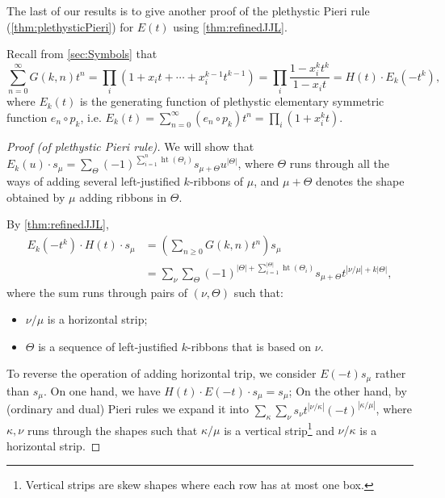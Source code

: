 \documentclass[pdflatex,sn-mathphys-num]{sn-jnl}%
\theoremstyle{thmstyleone}%
\theoremstyle{thmstyletwo}%
\theoremstyle{thmstylethree}%
\numberwithin{equation}{section}
\DeclareMathOperator{\htt}{ht}
\begin{document}
        The last of our results is to give another proof of the plethystic Pieri rule (\cref{thm:plethysticPieri}) for $E(t)$ using \cref{thm:refinedJJL}.

        Recall from \cref{sec:Symbols} that 
        \[\sum_{n=0}^\infty G(k,n) t^n = \prod_{i} (1+x_it+\cdots+x_i^{k-1}t^{k-1}) = \prod_i \frac{1-x_i^kt^k}{1-x_it}= H(t)\cdot E_k(-t^k),\]
        where $E_k(t)$ is the generating function of plethystic elementary symmetric function $e_n\circ p_k$, i.e. $E_k(t)=\sum_{n=0}^\infty (e_n\circ p_k)t^n=\prod_{i}(1+x_i^kt)$.

        
        \begin{proof}[Proof (of plethystic Pieri rule)]
            We will show that $E_k(u)\cdot s_\mu = \sum_{\Theta} (-1)^{\sum_{i=1}^n\htt(\Theta_i)}s_{\mu+\Theta} u^{|\Theta|}$, where $\Theta$ runs through all the ways of adding several left-justified $k$-ribbons of $\mu$, and $\mu+\Theta$ denotes the shape obtained by $\mu$ adding ribbons in $\Theta$.

            By \cref{thm:refinedJJL}, 
            \begin{align*}
                E_k(-t^k)\cdot H(t)\cdot s_\mu 
                &= \left(\sum_{n\geq 0}G(k,n)t^n\right) s_\mu \\&=\sum_{\nu}\sum_{\Theta} (-1)^{|\Theta|+\sum_{i=1}^{|\Theta|}\htt(\Theta_i)}s_{\mu+\Theta} t^{|\nu/\mu|+k|\Theta|},
            \end{align*}
            where the sum runs through pairs of $(\nu,\Theta)$ such that:
            \begin{itemize}
                \item $\nu/\mu$ is a horizontal strip;
                \item $\Theta$ is a sequence of left-justified $k$-ribbons that is based on $\nu$.
            \end{itemize}

            To reverse the operation of adding horizontal trip, we consider $E(-t) s_\mu$ rather than $s_\mu$. On one hand, we have $H(t)\cdot E(-t)\cdot s_\mu=s_\mu$; On the other hand, by (ordinary and dual) Pieri rules we expand it into $\sum_{\kappa}\sum_{\nu} s_\nu t^{|\nu/\kappa|}(-t)^{|\kappa/\mu|}$, where $\kappa,\nu$ runs through the shapes such that $\kappa/\mu$ is a vertical strip\footnote{Vertical strips are skew shapes where each row has at most one box.} and $\nu/\kappa$ is a horizontal strip.


\end{proof}
\end{document}
